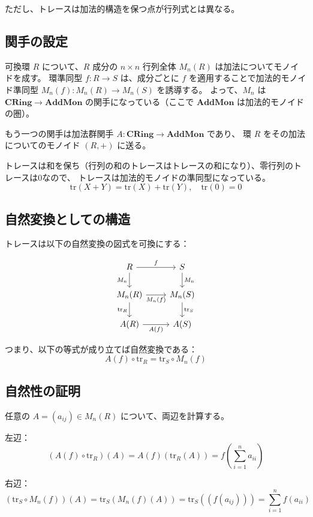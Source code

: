 \documentclass[uplatex,a4j,12pt,dvipdfmx]{jsarticle}
\begin{document}
ただし、トレースは加法的構造を保つ点が行列式とは異なる。

\subsection{関手の設定}

可換環 $R$ について、$R$ 成分の $n \times n$ 行列全体 $M_n(R)$ は加法についてモノイドを成す。
環準同型 $f: R \to S$ は、成分ごとに $f$ を適用することで加法的モノイド準同型 $M_n(f): M_n(R) \to M_n(S)$ を誘導する。
よって、$M_n$ は $\mathbf{CRing} \to \mathbf{AddMon}$ の関手になっている（ここで $\mathbf{AddMon}$ は加法的モノイドの圏）。

もう一つの関手は加法群関手 $A: \mathbf{CRing} \to \mathbf{AddMon}$ であり、
環 $R$ をその加法についてのモノイド $(R, +)$ に送る。

トレースは和を保ち（行列の和のトレースはトレースの和になり）、零行列のトレースは$0$なので、
トレースは加法的モノイドの準同型になっている。
\[
	\text{tr}(X + Y) = \text{tr}(X) + \text{tr}(Y), \quad \text{tr}(0) = 0
\]

\subsection{自然変換としての構造}

トレースは以下の自然変換の図式を可換にする：

\[
	\begin{tikzcd}
		R \arrow[r, "f"]
		\arrow[d, "M_n"']
		&
		S \arrow[d, "M_n"] \\
		M_n(R) \arrow[r, "M_n(f)"']
		\arrow[d, "\text{tr}_R"']
		&
		M_n(S) \arrow[d, "\text{tr}_S"] \\
		A(R) \arrow[r, "A(f)"']
		&
		A(S)
	\end{tikzcd}
\]

つまり、以下の等式が成り立てば自然変換である：
\[
	A(f) \circ \text{tr}_R = \text{tr}_S \circ M_n(f)
\]

\subsection{自然性の証明}

任意の $A = (a_{ij}) \in M_n(R)$ について、両辺を計算する。

左辺：
\[
	(A(f) \circ \text{tr}_R)(A) = A(f)(\text{tr}_R(A)) = f\left(\sum_{i=1}^n a_{ii}\right)
\]

右辺：
\[
	(\text{tr}_S \circ M_n(f))(A) = \text{tr}_S(M_n(f)(A)) = \text{tr}_S((f(a_{ij}))) = \sum_{i=1}^n f(a_{ii})
\]
\end{document}
